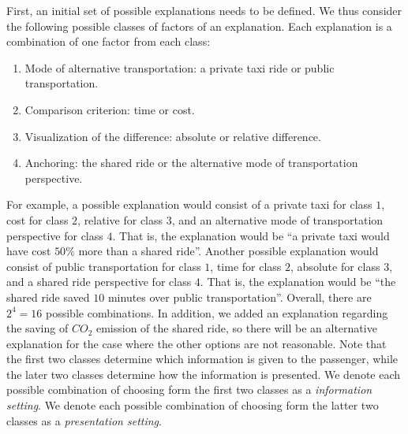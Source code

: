 \documentclass[letterpaper]{article} %
\begin{document}
First, an initial set of possible explanations needs to be defined. We thus consider the following possible classes of factors of an explanation. Each explanation is a combination of one factor from each class:
\begin{enumerate}
    \item Mode of alternative transportation: a private taxi ride or public transportation.
    \item Comparison criterion: time or cost.
    \item Visualization of the difference: absolute or relative difference.
    \item Anchoring: the shared ride or the alternative mode of transportation perspective.
\end{enumerate}
For example, a possible explanation would consist of a private taxi for class $1$, cost for class $2$, relative for class $3$, and an alternative mode of transportation perspective for class $4$. That is, the explanation would be ``a private taxi would have cost $50\%$ more than a shared ride''. Another possible explanation would consist of public transportation for class $1$, time for class $2$, absolute for class $3$, and a shared ride perspective for class $4$. That is, the explanation would be ``the shared ride saved $10$ minutes over  public transportation''. Overall, there are $2^4 = 16$ possible combinations. In addition, we added an explanation regarding the saving of $CO_2$ emission of the shared ride, so there will be an alternative explanation for the case where the other options are not reasonable.
Note that the first two classes determine which information is given to the passenger, while the later two classes determine how the information is presented. We denote each possible combination of choosing form the first two classes as a \textit{information setting}. We denote each possible combination of choosing form the latter two classes as a \textit{presentation setting}.
%
\end{document}
